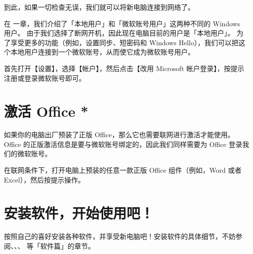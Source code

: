 到此，如果一切检查无误，我们就可以将新电脑连接到网络了。

在 一章，我们介绍了「本地用户」和「微软账号用户」这两种不同的 Windows 用户。
由于我们选择了断网开机，因此现在电脑目前的用户是「本地用户」。
为了享受更多的功能（例如，设置同步、短密码和 Windows Hello），我们可以把这个本地用户连接到一个微软账号，从而使它成为微软账号用户。

首先打开【设置】，选择【帐户】，然后点击【改用 Microsoft 帐户登录】，按提示注册或登录微软账号即可。

\section{激活 Office *}

如果你的电脑出厂预装了正版 Office，那么它也需要联网进行激活才能使用。
Office 的正版激活信息是要与微软账号绑定的，因此我们同样需要为 Office 登录我们的微软账号。

在联网条件下，打开电脑上预装的任意一款正版 Office 组件（例如，Word 或者 Excel），然后按提示操作。

\section{安装软件，开始使用吧！}

按照自己的喜好安装各种软件，并享受新电脑吧！安装软件的具体细节，不妨参阅、、、 等「软件篇」的章节。
